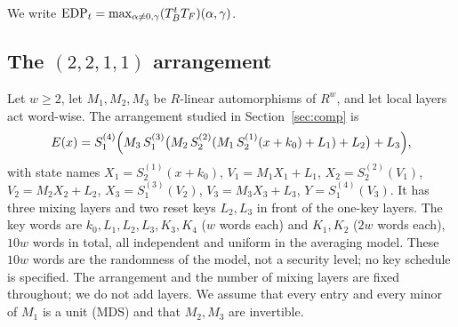 We write $\mathrm{EDP}_t=\max_{\alpha\ne0,\gamma}(T_B^tT_F)(\alpha,\gamma)$.

\subsection{The \texorpdfstring{$(2,2,1,1)$}{(2,2,1,1)} arrangement}\label{ss:arr}
Let $w\ge2$, let $M_1,M_2,M_3$ be $R$-linear automorphisms of $R^w$, and let local layers act
word-wise. The arrangement studied in Section~\ref{sec:comp} is
\[
E(x)=S_1^{(4)}\Bigl(M_3\,S_1^{(3)}\bigl(M_2\,S_2^{(2)}(M_1\,S_2^{(1)}(x+k_0)+L_1)+L_2\bigr)+L_3\Bigr),
\]
with state names $X_1=S_2^{(1)}(x+k_0)$, $V_1=M_1X_1+L_1$, $X_2=S_2^{(2)}(V_1)$, $V_2=M_2X_2+L_2$,
$X_3=S_1^{(3)}(V_2)$, $V_3=M_3X_3+L_3$, $Y=S_1^{(4)}(V_3)$. It has three mixing layers and two
reset keys $L_2,L_3$ in front of the one-key layers. The key words are
$k_0,L_1,L_2,L_3,K_3,K_4$ ($w$ words each) and $K_1,K_2$ ($2w$ words each), $10w$ words in total,
all independent and uniform in the averaging model. These $10w$ words are the randomness of the
model, not a security level; no key schedule is specified. The arrangement and the number of mixing
layers are fixed throughout; we do not add layers. We assume that every entry and every minor of
$M_1$ is a unit (MDS) and that $M_2,M_3$ are invertible.
